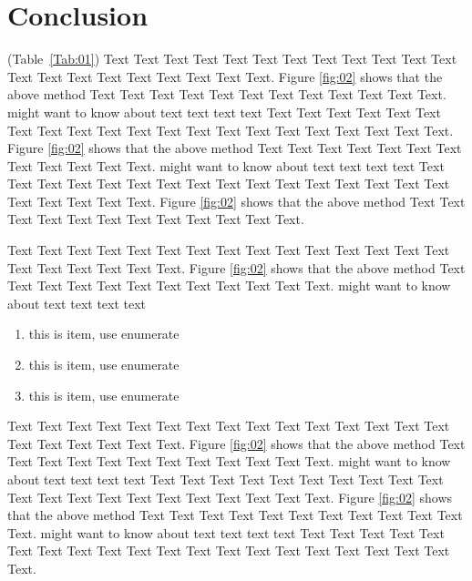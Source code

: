 \documentclass{bioinfo}
\begin{document}
%
%






\section{Conclusion}

(Table~\ref{Tab:01}) Text Text Text Text Text Text  Text Text Text Text Text Text Text Text Text  Text Text Text Text Text Text. Figure \ref{fig:02} shows that the above method  Text Text Text Text  Text Text Text Text Text Text  Text Text.  \citealp{Boffelli03} might want to know about  text text text text
Text Text Text Text Text Text  Text Text Text Text Text Text Text Text Text  Text Text Text Text Text Text. Figure \ref{fig:02} shows that the above method  Text Text Text Text  Text Text Text Text Text Text  Text Text.  \citealp{Boffelli03} might want to know about  text text text text
Text Text Text Text Text Text  Text Text Text Text Text Text Text Text Text  Text Text Text Text Text Text. Figure \ref{fig:02} shows that the above method  Text Text Text Text  Text Text Text Text Text Text  Text Text.



Text Text Text Text Text Text  Text Text Text Text Text Text Text Text Text  Text Text Text Text Text Text. Figure \ref{fig:02} shows that the above method  Text Text Text Text  Text Text Text Text Text Text  Text Text.  \citealp{Boffelli03} might want to know about  text text text text





\begin{enumerate}
\item this is item, use enumerate
\item this is item, use enumerate
\item this is item, use enumerate
\end{enumerate}

Text Text Text Text Text Text  Text Text Text Text Text Text Text Text Text  Text Text Text Text Text Text. Figure \ref{fig:02} shows that the above method  Text Text Text Text  Text Text Text Text Text Text  Text Text.  \citealp{Boffelli03} might want to know about  text text text text
Text Text Text Text Text Text  Text Text Text Text Text Text Text Text Text  Text Text Text Text Text Text. Figure \ref{fig:02} shows that the above method  Text Text Text Text  Text Text Text Text Text Text  Text Text.  \citealp{Boffelli03} might want to know about  text text text text
Text Text Text Text Text Text  Text Text Text Text Text Text Text Text Text  Text Text Text Text Text Text.
\end{document}
